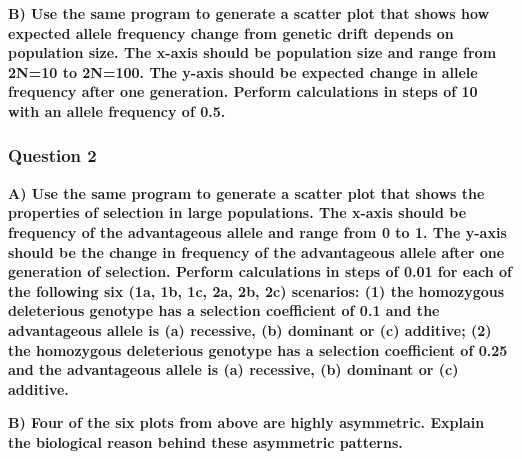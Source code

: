 \documentclass[]{article}
\newenvironment{Shaded}{\begin{snugshade}}{\end{snugshade}}
\newcommand{\CommentTok}[1]{\textcolor[rgb]{0.56,0.35,0.01}{\textit{{#1}}}}
\begin{document}
\begin{Shaded}
\end{Shaded}

\textbf{B) Use the same program to generate a scatter plot that shows
how expected allele frequency change from genetic drift depends on
population size. The x-axis should be population size and range from
2N=10 to 2N=100. The y-axis should be expected change in allele
frequency after one generation. Perform calculations in steps of 10 with
an allele frequency of 0.5.}

\subsubsection{Question 2}\label{question-2}

\textbf{A) Use the same program to generate a scatter plot that shows
the properties of selection in large populations. The x-axis should be
frequency of the advantageous allele and range from 0 to 1. The y-axis
should be the change in frequency of the advantageous allele after one
generation of selection. Perform calculations in steps of 0.01 for each
of the following six (1a, 1b, 1c, 2a, 2b, 2c) scenarios: (1) the
homozygous deleterious genotype has a selection coefficient of 0.1 and
the advantageous allele is (a) recessive, (b) dominant or (c) additive;
(2) the homozygous deleterious genotype has a selection coefficient of
0.25 and the advantageous allele is (a) recessive, (b) dominant or (c)
additive.}

\textbf{B) Four of the six plots from above are highly asymmetric.
Explain the biological reason behind these asymmetric patterns.}
\end{document}
